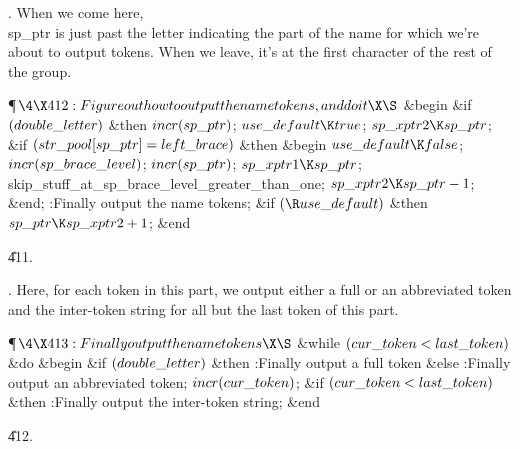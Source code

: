 .
When we come here, \\{sp\_ptr} is just past the letter indicating the
part of the name for which we're about to output tokens.  When we
leave, it's at the first character of the rest of the group.

\Y\P$\4\X412:Figure out how to output the name tokens, and do it\X\S$\6
\&{begin} \&{if} $(\\{double\_letter})$ \1\&{then}\5
$\\{incr}(\\{sp\_ptr})$;\2\6
$\\{use\_default}\K\\{true}$;\5
$\\{sp\_xptr2}\K\\{sp\_ptr}$;\6
\&{if} $(\\{str\_pool}[\\{sp\_ptr}]=\\{left\_brace})$ \1\&{then}\6
\&{begin} $\\{use\_default}\K\\{false}$;\5
$\\{incr}(\\{sp\_brace\_level})$;\5
$\\{incr}(\\{sp\_ptr})$;\5
$\\{sp\_xptr1}\K\\{sp\_ptr}$;\5
\\{skip\_stuff\_at\_sp\_brace\_level\_greater\_than\_one};\5
$\\{sp\_xptr2}\K\\{sp\_ptr}-1$;\6
\&{end};\2\6
:Finally output the name tokens\X;\6
\&{if} $(\R\\{use\_default})$ \1\&{then}\5
$\\{sp\_ptr}\K\\{sp\_xptr2}+1$;\2\6
\&{end}\par
\U411.\fi

.
Here, for each token in this part, we output either a full or an
abbreviated token and the inter-token string for all but the last
token of this part.

\Y\P$\4\X413:Finally output the name tokens\X\S$\6
\&{while} $(\\{cur\_token}<\\{last\_token})$ \1\&{do}\6
\&{begin} \&{if} $(\\{double\_letter})$ \1\&{then}\5
:Finally output a full token\X\6
\4\&{else} :Finally output an abbreviated token\X;\2\6
$\\{incr}(\\{cur\_token})$;\6
\&{if} $(\\{cur\_token}<\\{last\_token})$ \1\&{then}\5
:Finally output the inter-token string\X;\2\6
\&{end}\2\par
\U412.\fi

